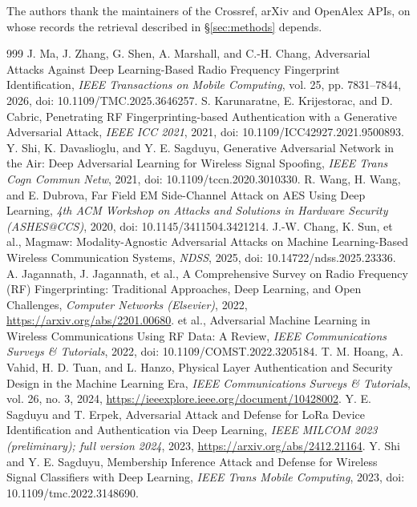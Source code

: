 \documentclass[10.5pt,compsoc,winfonts]{ICN}
\begin{document}
\begin{acknowledgement}
The authors thank the maintainers of the Crossref, arXiv and OpenAlex APIs, on whose records the
retrieval described in \S\ref{sec:methods} depends.
\end{acknowledgement}


\begin{thebibliography}{999}
\small
{}
J. Ma, J. Zhang, G. Shen, A. Marshall, and C.-H. Chang, Adversarial Attacks Against Deep Learning-Based Radio Frequency Fingerprint Identification, \emph{IEEE Transactions on Mobile Computing}, vol. 25, pp. 7831–7844, 2026, doi: 10.1109/TMC.2025.3646257.
S. Karunaratne, E. Krijestorac, and D. Cabric, Penetrating RF Fingerprinting-based Authentication with a Generative Adversarial Attack, \emph{IEEE ICC 2021}, 2021, doi: 10.1109/ICC42927.2021.9500893.
Y. Shi, K. Davaslioglu, and Y. E. Sagduyu, Generative Adversarial Network in the Air: Deep Adversarial Learning for Wireless Signal Spoofing, \emph{IEEE Trans Cogn Commun Netw}, 2021, doi: 10.1109/tccn.2020.3010330.
R. Wang, H. Wang, and E. Dubrova, Far Field EM Side-Channel Attack on AES Using Deep Learning, \emph{4th ACM Workshop on Attacks and Solutions in Hardware Security (ASHES@CCS)}, 2020, doi: 10.1145/3411504.3421214.
J.-W. Chang, K. Sun, et al., Magmaw: Modality-Agnostic Adversarial Attacks on Machine Learning-Based Wireless Communication Systems, \emph{NDSS}, 2025, doi: 10.14722/ndss.2025.23336.
A. Jagannath, J. Jagannath, et al., A Comprehensive Survey on Radio Frequency (RF) Fingerprinting: Traditional Approaches, Deep Learning, and Open Challenges, \emph{Computer Networks (Elsevier)}, 2022, \url{https://arxiv.org/abs/2201.00680}.
et al., Adversarial Machine Learning in Wireless Communications Using RF Data: A Review, \emph{IEEE Communications Surveys \& Tutorials}, 2022, doi: 10.1109/COMST.2022.3205184.
T. M. Hoang, A. Vahid, H. D. Tuan, and L. Hanzo, Physical Layer Authentication and Security Design in the Machine Learning Era, \emph{IEEE Communications Surveys \& Tutorials}, vol. 26, no. 3, 2024, \url{https://ieeexplore.ieee.org/document/10428002}.
Y. E. Sagduyu and T. Erpek, Adversarial Attack and Defense for LoRa Device Identification and Authentication via Deep Learning, \emph{IEEE MILCOM 2023 (preliminary); full version 2024}, 2023, \url{https://arxiv.org/abs/2412.21164}.
Y. Shi and Y. E. Sagduyu, Membership Inference Attack and Defense for Wireless Signal Classifiers with Deep Learning, \emph{IEEE Trans Mobile Computing}, 2023, doi: 10.1109/tmc.2022.3148690.

\end{thebibliography}
\end{document}
